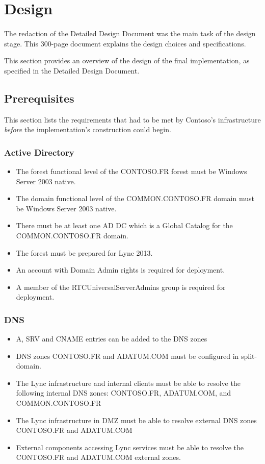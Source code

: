 \section{Design}
\paragraph{}
The redaction of the Detailed Design Document was the main task of the design stage. This 300-page document explains the design choices and specifications.

This section provides an overview of the design of the final implementation, as specified in the Detailed Design Document.

\subsection{Prerequisites}
This section lists the requirements that had to be met by Contoso's infrastructure \textit{before} the implementation's construction could begin.

	\subsubsection{Active Directory}
		\begin{itemize}
			\item The forest functional level of the CONTOSO.FR forest must be Windows Server 2003 native.
			\item The domain functional level of the COMMON.CONTOSO.FR domain must be Windows Server 2003 native.
			\item There must be at least one AD DC which is a Global Catalog for the COMMON.CONTOSO.FR domain.
			\item The forest must be prepared for Lync 2013.
			\item An account with Domain Admin rights is required for deployment.
			\item A member of the RTCUniversalServerAdmins group is required for deployment.
		\end{itemize}
		
	\subsubsection{DNS}
		\begin{itemize}
			\item A, SRV and CNAME entries can be added to the DNS zones
			\item DNS zones CONTOSO.FR and ADATUM.COM must be configured in split-domain.
			\item The Lync infrastructure and internal clients must be able to resolve the following internal DNS zones: CONTOSO.FR, ADATUM.COM, and COMMON.CONTOSO.FR
			\item The Lync infrastructure in DMZ must be able to resolve external DNS zones CONTOSO.FR and ADATUM.COM
			\item External components accessing Lync services must be able to resolve the CONTOSO.FR and ADATUM.COM external zones.
		\end{itemize}
		

